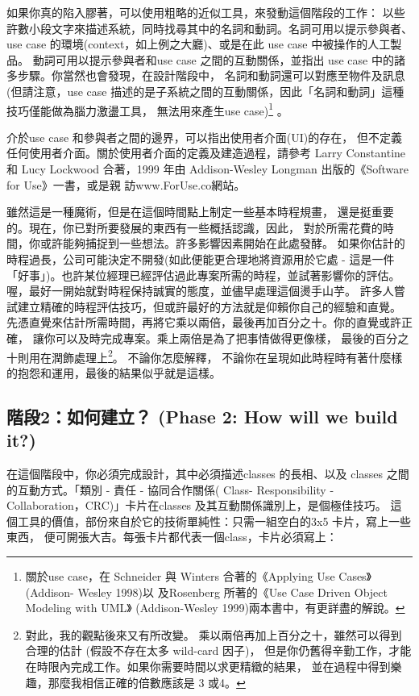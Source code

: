 如果你真的陷入膠著，可以使用粗略的近似工具，來發動這個階段的工作：
以些許數小段文字來描述系統，同時找尋其中的名詞和動詞。名詞可用以提示參與者、
use case 的環境(context，如上例之大廳)、或是在此 use case 中被操作的人工製品。
動詞可用以提示參與者和use case 之間的互動關係，並指出
use case 中的諸多步驟。你當然也會發現，在設計階段中，
名詞和動詞還可以對應至物件及訊息(但請注意，use case
描述的是子系統之間的互動關係，因此「名詞和動詞」這種技巧僅能做為腦力激盪工具，
無法用來產生use case)\footnote{關於use case，在 Schneider 與 Winters
合著的《Applying Use Cases》(Addison- Wesley 1998)以
及Rosenberg 所著的《Use Case Driven Object Modeling with UML》
 (Addison-Wesley 1999)兩本書中，有更詳盡的解說。} 。

介於use case 和參與者之間的邊界，可以指出使用者介面(UI)的存在，
但不定義任何使用者介面。關於使用者介面的定義及建造過程，請參考
Larry Constantine 和 Lucy Lockwood 合著，1999 年由 Addison-Wesley Longman
出版的《Software for Use》一書，或是親 訪www.ForUse.co網站。

雖然這是一種魔術，但是在這個時間點上制定一些基本時程規畫，
還是挺重要的。現在，你已對所要發展的東西有一些概括認識，因此，
對於所需花費的時間，你或許能夠捕捉到一些想法。許多影響因素開始在此處發酵。
如果你估計的時程過長，公司可能決定不開發(如此便能更合理地將資源用於它處 -
這是一件「好事」)。也許某位經理已經評估過此專案所需的時程，並試著影響你的評估。
喔，最好一開始就對時程保持誠實的態度，並儘早處理這個燙手山芋。
許多人嘗試建立精確的時程評估技巧，但或許最好的方法就是仰賴你自己的經驗和直覺。
先憑直覺來估計所需時間，再將它乘以兩倍，最後再加百分之十。你的直覺或許正確，
讓你可以及時完成專案。乘上兩倍是為了把事情做得更像樣，
最後的百分之十則用在潤飾處理上\footnote{對此，我的觀點後來又有所改變。
乘以兩倍再加上百分之十，雖然可以得到合理的估計 (假設不存在太多 wild-card 因子)，
但是你仍舊得辛勤工作，才能在時限內完成工作。如果你需要時間以求更精緻的結果，
並在過程中得到樂趣，那麼我相信正確的倍數應該是 3 或4。}。 不論你怎麼解釋，
不論你在呈現如此時程時有著什麼樣的抱怨和運用，最後的結果似乎就是這樣。

\subsection{階段2：如何建立？ (Phase 2: How will we build it?)}
在這個階段中，你必須完成設計，其中必須描述classes 的長相、以及 classes
之間的互動方式。「類別 - 責任 - 協同合作關係( Class- Responsibility -
Collaboration，CRC)」卡片在classes 及其互動關係識別上，是個極佳技巧。
這個工具的價值，部份來自於它的技術單純性：只需一組空白的3x5 卡片，寫上一些東西，
便可開張大吉。每張卡片都代表一個class，卡片必須寫上：

